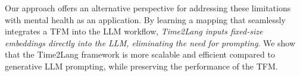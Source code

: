 Our approach offers an alternative perspective for addressing these limitations with mental health as an application. By learning a mapping that seamlessly integrates a TFM into the LLM workflow, \textit{Time2Lang inputs fixed-size embeddings directly into the LLM, eliminating the need for prompting}. We show that the Time2Lang framework is more scalable and efficient compared to generative LLM prompting, while preserving the performance of the TFM.